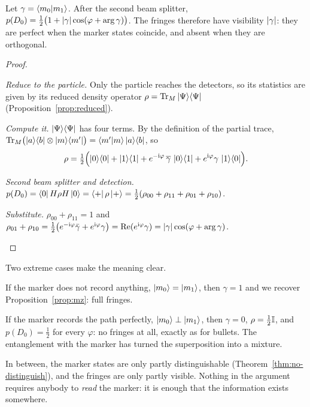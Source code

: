 \begin{theorem}\label{thm:visibility}
  Let $\gamma=\left\langle m_0\middle|m_1\right\rangle$. After the second beam splitter, $p(D_0)=\tfrac12\bigl(1+\left|\gamma\right|\cos(\varphi+\arg\gamma)\bigr)$. The fringes therefore have visibility $\left|\gamma\right|$: they are perfect when the marker states coincide, and absent when they are orthogonal.
\end{theorem}
\begin{proof}
  \begin{steps}
    \item \emph{Reduce to the particle.} Only the particle reaches the detectors, so its statistics are given by its reduced density operator $\rho=\operatorname{Tr}_M\left|\Psi\right\rangle\!\left\langle\Psi\right|$ (Proposition~\ref{prop:reduced}).
    \item \emph{Compute it.} $\left|\Psi\right\rangle\!\left\langle\Psi\right|$ has four terms. By the definition of the partial trace, $\operatorname{Tr}_M\bigl(\left|a\right\rangle\!\left\langle b\right|\otimes\left|m\right\rangle\!\left\langle m'\right|\bigr)=\left\langle m'\middle|m\right\rangle\left|a\right\rangle\!\left\langle b\right|$, so
      \[
        \rho=\tfrac12\Bigl(\left|0\right\rangle\!\left\langle0\right|+\left|1\right\rangle\!\left\langle1\right|+e^{-\mathrm{i}\varphi}\,\overline{\gamma}\,\left|0\right\rangle\!\left\langle1\right|+e^{\mathrm{i}\varphi}\gamma\,\left|1\right\rangle\!\left\langle0\right|\Bigr).
      \]
    \item \emph{Second beam splitter and detection.} $p(D_0)=\left\langle0\right|H\rho H\left|0\right\rangle=\left\langle+\right|\rho\left|+\right\rangle=\tfrac12(\rho_{00}+\rho_{11}+\rho_{01}+\rho_{10})$.
    \item \emph{Substitute.} $\rho_{00}+\rho_{11}=1$ and $\rho_{01}+\rho_{10}=\tfrac12\bigl(e^{-\mathrm{i}\varphi}\bar\gamma+e^{\mathrm{i}\varphi}\gamma\bigr)=\operatorname{Re}(e^{\mathrm{i}\varphi}\gamma)=\left|\gamma\right|\cos(\varphi+\arg\gamma)$. \qedhere
  \end{steps}
\end{proof}

Two extreme cases make the meaning clear.
\begin{steps}
  \item If the marker does not record anything, $\left|m_0\right\rangle=\left|m_1\right\rangle$, then $\gamma=1$ and we recover Proposition~\ref{prop:mz}: full fringes.
  \item If the marker records the path perfectly, $\left|m_0\right\rangle\perp\left|m_1\right\rangle$, then $\gamma=0$, $\rho=\tfrac12\mathbb{I}$, and $p(D_0)=\tfrac12$ for every $\varphi$: no fringes at all, exactly as for bullets. The entanglement with the marker has turned the superposition into a mixture.
\end{steps}
In between, the marker states are only partly distinguishable (Theorem~\ref{thm:no-distinguish}), and the fringes are only partly visible. Nothing in the argument requires anybody to \emph{read} the marker: it is enough that the information exists somewhere.

